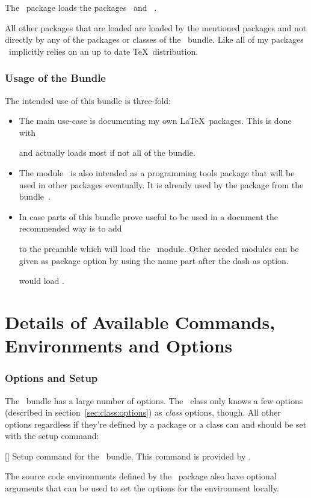 \documentclass[load-preamble+,babel-options={ngerman,english}]{cnltx-doc}
\begin{document}
The \cnltxtools\ package loads the packages \cnltxbase\ and
\oberdiekfn~\cite{pkg:accsupp}.

All other packages that are loaded are loaded by the mentioned packages and
not directly by any of the packages or classes of the \cnltx\ bundle.  Like
all of my packages \cnltx\ implicitly relies on an up to date \TeX\
distribution.

\section{Usage of the Bundle}\label{sec:usage-bundle}
The intended use of this bundle is three-fold:
\begin{itemize}
  \item The main use-case is documenting my own \LaTeX\ packages.  This is
    done with
    \begin{sourcecode}[gobble=6]
      \documentclass{cnltx-doc}
    \end{sourcecode}
    and actually loads most if not all of the bundle.
  \item The module \cnltxbase\ is also intended as a programming tools package
    that will be used in other packages eventually.  It is already used by the
    \pkg{cntformats} package from the \bnd{exsheets}
    bundle~\cite{bnd:exsheets}.
  \item In case parts of this bundle prove useful to be used in a document the
    recommended way is to add
    \begin{sourcecode}[gobble=6]
      \usepackage{cnltx}
    \end{sourcecode}
    to the preamble which will load the \cnltxbase\ module.  Other needed
    modules can be given as package option by using the name part after the
    dash as option.
    \begin{sourcecode}[gobble=6]
      \usepackage[example]{cnltx}
    \end{sourcecode}
    would load \cnltxexample.
\end{itemize}

\part{Details of Available Commands, Environments and Options}

\section{Options and Setup}
The \cnltx\ bundle has a large number of options.  The \cnltxdoc\ class only
knows a few options (described in section~\vref{sec:class:options}) as
\emph{class} options, though.  All other options regardless if they're defined
by a package or a class can and should be set with the setup command:
\begin{commands}
  []
    Setup command for the \cnltx\ bundle.  This command is provided by
    \cnltxbase.
\end{commands}
The source code environments defined by the \cnltxexample\ package also have
optional arguments that can be used to set the options for the environment
locally.
\end{document}
